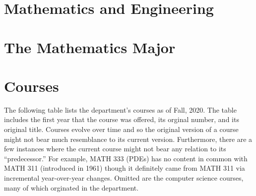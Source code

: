 \documentclass[
]{book}
\begin{document}
\hypertarget{mathematics-and-engineering}{%
\chapter{Mathematics and Engineering}\label{mathematics-and-engineering}}

\hypertarget{the-mathematics-major-1}{%
\chapter{The Mathematics Major}\label{the-mathematics-major-1}}

\hypertarget{courses}{%
\chapter{Courses}\label{courses}}

The following table lists the department's courses as of Fall, 2020. The table includes the first year that the course was offered, its orginal number, and its original title. Courses evolve over time and so the original version of a course might not bear much resemblance to its current version. Furthermore, there are a few instances where the current course might not bear any relation to its ``predecessor.'' For example, MATH 333 (PDEs) has no content in common with MATH 311 (introduced in 1961) though it definitely came from MATH 311 via incremental year-over-year changes. Omitted are the computer science courses, many of which orginated in the department.
\end{document}
